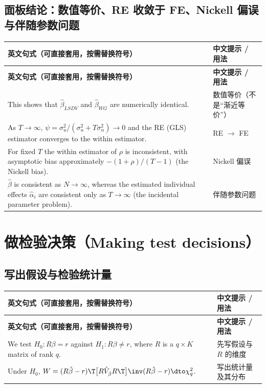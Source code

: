 \subsection{面板结论：数值等价、RE 收敛于 FE、Nickell 偏误与伴随参数问题}

{\renewcommand{\arraystretch}{1.15}\begin{longtable}{@{}>{\raggedright\arraybackslash}p{11.4cm}>{\raggedright\arraybackslash\small}p{4.3cm}@{}}
\toprule
\textbf{英文句式（可直接套用，按需替换符号）} & \textbf{中文提示 / 用法}\\
\midrule
\endfirsthead
\toprule
\textbf{英文句式（可直接套用，按需替换符号）} & \textbf{中文提示 / 用法}\\
\midrule
\endhead
\bottomrule
\endlastfoot
This shows that $\hat\beta_{LSDV}$ and $\hat\beta_{WG}$ are numerically identical. & 数值等价（不是“渐近等价”）\\
\addlinespace[2pt]
As $T\to\infty$, $\psi=\sigma_u^2/(\sigma_u^2+T\sigma_\alpha^2)\to 0$ and the RE (GLS) estimator converges to the within estimator. & RE $\to$ FE\\
\addlinespace[2pt]
For fixed $T$ the within estimator of $\rho$ is inconsistent, with asymptotic bias approximately $-(1+\rho)/(T-1)$ (the Nickell bias). & Nickell 偏误\\
\addlinespace[2pt]
$\hat\beta$ is consistent as $N\to\infty$, whereas the estimated individual effects $\hat\alpha_i$ are consistent only as $T\to\infty$ (the incidental parameter problem). & 伴随参数问题\\
\end{longtable}}


\section{做检验决策（Making test decisions）}\label{sec:UappC-tests}

\subsection{写出假设与检验统计量}

{\renewcommand{\arraystretch}{1.15}\begin{longtable}{@{}>{\raggedright\arraybackslash}p{11.4cm}>{\raggedright\arraybackslash\small}p{4.3cm}@{}}
\toprule
\textbf{英文句式（可直接套用，按需替换符号）} & \textbf{中文提示 / 用法}\\
\midrule
\endfirsthead
\toprule
\textbf{英文句式（可直接套用，按需替换符号）} & \textbf{中文提示 / 用法}\\
\midrule
\endhead
\bottomrule
\endlastfoot
We test $H_0:R\beta=r$ against $H_1:R\beta\neq r$, where $R$ is a $q\times K$ matrix of rank $q$. & 先写假设与 $R$ 的维度\\
\addlinespace[2pt]
Under $H_0$, $W=(R\hat\beta-r)\T\bigl[R\hat V_{\hat\beta}R\T\bigr]\inv(R\hat\beta-r)\dto\chi^2_q$. & 写出统计量及其分布\\
\end{longtable}}


